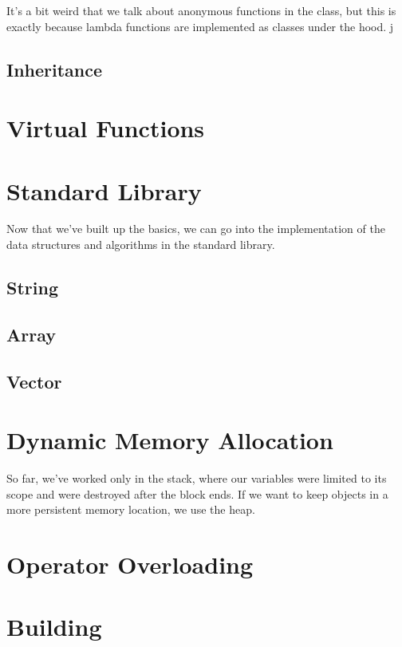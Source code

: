 \documentclass{article}
\begin{document}
      It's a bit weird that we talk about anonymous functions in the class, but this is exactly because lambda functions are implemented as classes under the hood. j

      \begin{definition}
        
      \end{definition} 

  \subsection{Inheritance}

\section{Virtual Functions} 

  

\section{Standard Library} 

    Now that we've built up the basics, we can go into the implementation of the data structures and algorithms in the standard library. 

  \subsection{String}

  \subsection{Array}

  \subsection{Vector}

\section{Dynamic Memory Allocation} 

  So far, we've worked only in the stack, where our variables were limited to its scope and were destroyed after the block ends. If we want to keep objects in a more persistent memory location, we use the heap.  

\section{Operator Overloading} 

\section{Building}
\end{document}
